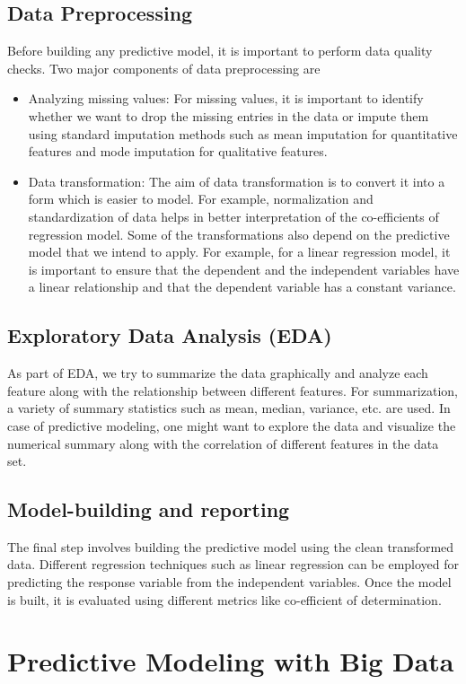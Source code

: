 \documentclass[sigconf]{acmart}
\begin{document}
\subsection{Data Preprocessing} 
Before building any predictive model, it is important to perform data quality checks. Two major components of data preprocessing are 
\begin{itemize}
	\item Analyzing missing values: For missing values, it is important to identify whether we want to drop the missing entries in the data or impute them using standard imputation methods such as mean imputation for quantitative features and mode imputation for qualitative features.
	\item Data transformation: The aim of data transformation is to convert it into a form which is easier to model. For example, normalization and standardization of data helps in better interpretation of the co-efficients of regression model. Some of the transformations also depend on the predictive model that we intend to apply. For example, for a linear regression model, it is important to ensure that the dependent and the independent variables have a linear relationship and that the dependent variable has a constant variance.
\end{itemize}
\subsection{Exploratory Data Analysis (EDA)} 
As part of EDA, we try to summarize the data graphically and analyze each feature along with the relationship between different features. For summarization, a variety of summary statistics such as mean, median, variance, etc. are used. In case of predictive modeling, one might want to explore the data and visualize the numerical summary along with the correlation of different features in the data set.
\subsection{Model-building and reporting}
The final step involves building the predictive model using the clean transformed data. Different regression techniques such as linear regression can be employed for predicting the response variable from the independent variables. Once the model is built, it is evaluated using different metrics like co-efficient of determination.

\section{Predictive Modeling with Big Data}
\end{document}
